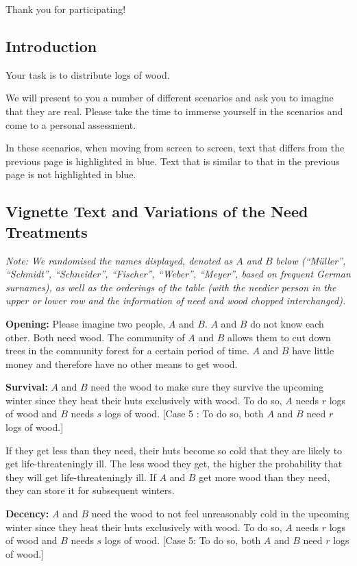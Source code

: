 \documentclass[egregdoesnotlikesansseriftitles]{scrartcl}
\begin{document}
Thank you for participating!


\subsection*{Introduction}
Your task is to distribute logs of wood.

We will present to you a number of different scenarios and ask you to imagine that they are real.
Please take the time to immerse yourself in the scenarios and come to a personal assessment.

In these scenarios, when moving from screen to screen, text that differs from the previous page is highlighted in blue.
Text that is similar to that in the previous page is not highlighted in blue.

\subsection*{Vignette Text and Variations of the Need Treatments}
\noindent\textit{Note: We randomised the names displayed, denoted as $A$ and $B$ below (``Müller'', ``Schmidt'', ``Schneider'', ``Fischer'', ``Weber'', ``Meyer'', based on frequent German surnames), as well as the orderings of the table (with the needier person in the upper or lower row and the information of need and wood chopped interchanged).}\vspace{2ex}

\noindent\textbf{Opening:} Please imagine two people, $A$ and $B$.
$A$ and $B$ do not know each other.
Both need wood.
The community of $A$ and $B$  allows them to cut down trees in the community forest for a certain period of time.
$A$ and $B$ have little money and therefore have no other means to get wood.\vspace{2ex}

\noindent\textbf{Survival:} $A$ and $B$ need the wood to make sure they survive the upcoming winter since they heat their huts exclusively with wood.
To do so, $A$ needs $r$ logs of wood and $B$ needs $s$ logs of wood.
[Case 5 : To do so, both $A$ and $B$ need $r$ logs of wood.]

If they get less than they need, their huts become so cold that they are likely to get life-threateningly ill.
The less wood they get, the higher the probability that they will get life-threateningly ill.
If $A$ and $B$ get more wood than they need, they can store it for subsequent winters.\vspace{2ex}

\noindent\textbf{Decency:} $A$ and $B$ need the wood to not feel unreasonably cold in the upcoming winter since they heat their huts exclusively with wood.
To do so, $A$ needs $r$ logs of wood and $B$ needs $s$ logs of wood.
[Case 5: To do so, both $A$ and $B$ need $r$ logs of wood.]
\end{document}
